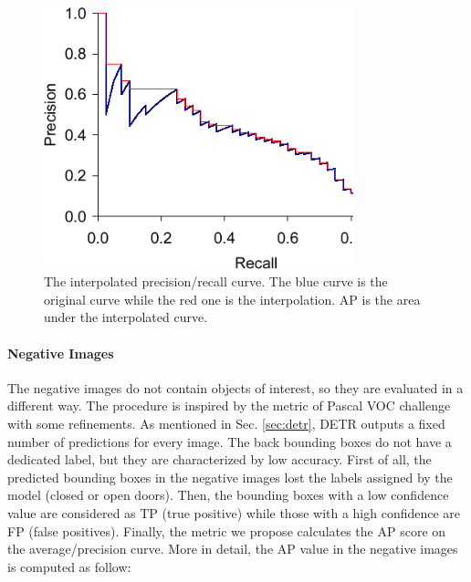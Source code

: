 \begin{figure}[h!]
	\centering
	\includegraphics[width=0.8\textwidth]{images/interpolated.png}
	\caption{The interpolated precision/recall curve. The blue curve is the original curve while the red one is the interpolation. AP is the area under the interpolated curve.}
	\label{fig:interpolation}
\end{figure}

\paragraph*{Negative Images} The negative images do not contain objects of interest, so they are evaluated in a different way. The procedure is inspired by the metric of Pascal VOC challenge \cite{pascal} with some refinements. As mentioned in Sec. \ref{sec:detr}, DETR outputs a fixed number of predictions for every image. The back bounding boxes do not have a dedicated label, but they are characterized by low accuracy. First of all, the predicted bounding boxes in the negative images lost the labels assigned by the model (\textsf{closed} or \textsf{open} doors). Then, the bounding boxes with a low confidence value are considered as TP (true positive) while those with a high confidence are FP (false positives). Finally, the metric we propose calculates the AP score on the average/precision curve. More in detail, the AP value in the negative images is computed as follow:

